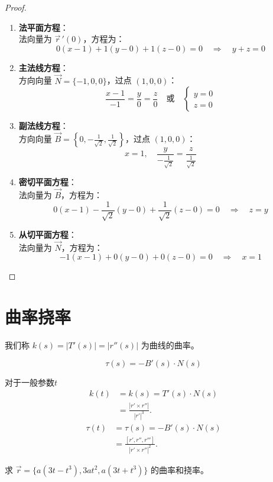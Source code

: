 \documentclass[lang=cn,10pt,thmcnt=section]{elegantbook}
\begin{document}
\begin{proof}
\begin{enumerate}
\begin{enumerate}
			\item \textbf{法平面方程}：\\
			法向量为 $\vec{r}\,'(0)$，方程为：
			\[
				0(x-1) + 1(y-0) + 1(z-0) = 0 \quad \Rightarrow \quad y + z = 0
			\]
			
			\item \textbf{主法线方程}：\\
			方向向量 $\vec{N} = \{-1, 0, 0\}$，过点 $(1, 0, 0)$：
			\[
				\frac{x-1}{-1} = \frac{y}{0} = \frac{z}{0} \quad \text{或} \quad 
				\begin{cases} 
					y = 0 \\ 
					z = 0 
				\end{cases}
			\]
			
			\item \textbf{副法线方程}：\\
			方向向量 $\vec{B} = \left\{0, -\frac{1}{\sqrt{2}}, \frac{1}{\sqrt{2}}\right\}$，过点 $(1, 0, 0)$：
			\[
				x = 1, \quad \frac{y}{-\frac{1}{\sqrt{2}}} = \frac{z}{\frac{1}{\sqrt{2}}}
			\]
			
			\item \textbf{密切平面方程}：\\
			法向量为 $\vec{B}$，方程为：
			\[
				0(x-1) -\frac{1}{\sqrt{2}}(y-0) + \frac{1}{\sqrt{2}}(z-0) = 0 \quad \Rightarrow \quad z = y
			\]
			
			\item \textbf{从切平面方程}：\\
			法向量为 $\vec{N}$，方程为：
			\[
				-1(x-1) + 0(y-0) + 0(z-0) = 0 \quad \Rightarrow \quad x = 1
			\]
		\end{enumerate}
	\end{enumerate}
\end{proof}
\section{曲率挠率}
\begin{definition}[曲率]
    我们称 $k(s) = |T'(s)| = |r''(s)|$ 为曲线的曲率。
\end{definition}
\begin{definition}[挠率]
    \[
    \tau(s) = -B'(s) \cdot N(s)
    \]
\end{definition}
对于一般参数$t$
\begin{align*}
    k(t) &= k(s) = T'(s) \cdot N(s) \\
     &= \frac{|r' \times r''|}{|r'|^3}.
\end{align*}
\begin{align*}
    \tau(t) &= \tau(s) = -B'(s) \cdot N(s)\\
    &= \frac{[r', r'', r''']}{|r' \times r''|^2}.
\end{align*} 

\begin{example}
	求 $\vec{r} = \{a(3t - t^3), 3at^2, a(3t + t^3)\}$ 的曲率和挠率。
\end{example}
\end{document}
